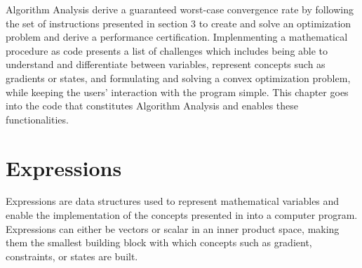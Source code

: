  

Algorithm Analysis derive a guaranteed worst-case convergence rate by following the set of instructions presented in section 3 to create and solve an optimization problem and derive a performance certification. Implenmenting a mathematical procedure as code presents a list of challenges which includes being able to understand and differentiate between variables, represent concepts such as gradients or states, and formulating and solving a convex optimization problem, while keeping the users' interaction with the program simple. This chapter goes into the code that constitutes Algorithm Analysis and enables these functionalities.

\section{Expressions}

Expressions are data structures used to represent mathematical variables and enable the implementation of the concepts presented in  into a computer program. Expressions can either be vectors or scalar in an inner product space, making them the smallest building block with which concepts such as gradient, constraints, or states are built.

